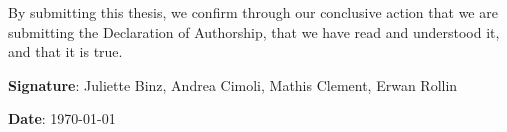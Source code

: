 \documentclass[hidelinks, 12pt, a4paper]{article}
\theoremstyle{definition}
\begin{document}
\vspace{0.5cm}

\noindent By submitting this thesis, we confirm through our conclusive action that we are submitting the Declaration of Authorship, that we have read and understood it, and that it is true.

\bigbreak
\noindent \textbf{Signature}: Juliette Binz, Andrea Cimoli, Mathis Clement, Erwan Rollin 

\hfill \textbf{Date}: \today
\end{document}
